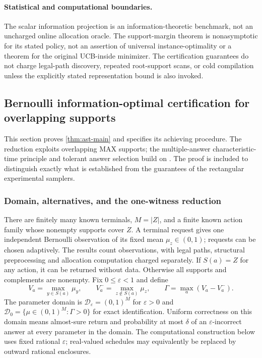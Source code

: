 \documentclass{article}
\theoremstyle{plain}
\theoremstyle{definition}
\begin{document}
\paragraph{Statistical and computational boundaries.}
The scalar information projection is an information-theoretic benchmark, not an uncharged online allocation oracle. The support-margin theorem is nonasymptotic for its stated policy, not an assertion of universal instance-optimality or a theorem for the original UCB-inside minimizer. The certification guarantees do not charge legal-path discovery, repeated root-support scans, or cold compilation unless the explicitly stated representation bound is also invoked.

\subsection{Bernoulli information-optimal certification for overlapping supports}
\label{app:ast-optimal}
This section proves \cref{thm:ast-main} and specifies its achieving procedure.
The reduction exploits overlapping MAX supports; the multiple-answer
characteristic-time principle and tolerant answer selection build on
\citet{degenne2019multiple}.  The proof is included to distinguish exactly what
is established from the guarantees of the rectangular experimental samplers.

\subsubsection{Domain, alternatives, and the one-witness reduction}
There are finitely many known terminals, $M=|Z|$, and a finite known action
family whose nonempty supports cover $Z$.  A terminal request gives one
independent Bernoulli observation of its fixed mean $\mu_z\in(0,1)$; requests
can be chosen adaptively.  The results count observations, with legal paths,
structural preprocessing and allocation computation charged separately.
If $S(a)=Z$ for any action, it can be returned without data.  Otherwise all
supports and complements are nonempty.  Fix $0\le\varepsilon<1$ and define
\[
 V_a=\max_{y\in S(a)}\mu_y,\qquad
 V_a^-=\max_{z\notin S(a)}\mu_z,\qquad
 \Gamma=\max_a(V_a-V_a^-).
\]
The parameter domain is
$\mathcal D_\varepsilon=(0,1)^M$ for $\varepsilon>0$ and
$\mathcal D_0=\{\mu\in(0,1)^M:\Gamma>0\}$ for exact identification.
Uniform correctness on this domain means almost-sure return and probability
at most $\delta$ of an $\varepsilon$-incorrect answer at every parameter in
the domain.  The computational construction below uses fixed rational
$\varepsilon$; real-valued schedules may equivalently be replaced by outward
rational enclosures.
\end{document}
